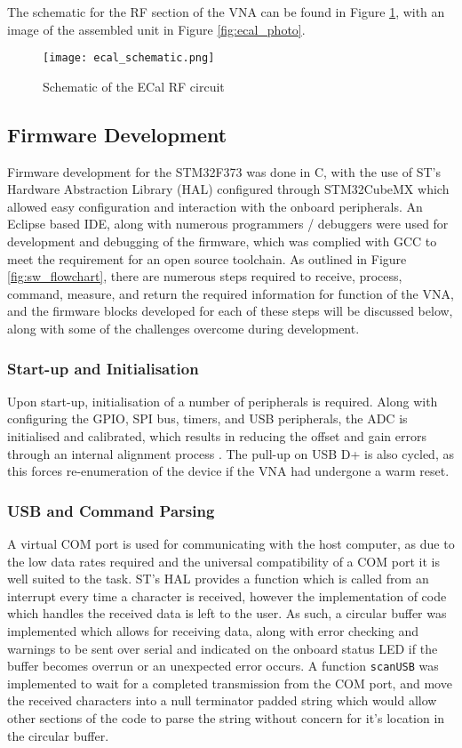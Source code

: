 The schematic for the RF section of the VNA can be found in Figure \ref{fig:ecal_schematic}, with an image of the assembled unit in Figure \ref{fig:ecal_photo}.

\begin{figure}[H]
	\centering
	\texttt{[image: ecal\_schematic.png]}
	\caption{Schematic of the ECal RF circuit}
	\label{fig:ecal_schematic}
\end{figure}

\newpage
\subsection{Firmware Development}
Firmware development for the STM32F373 was done in C, with the use of ST's Hardware Abstraction Library (HAL) configured through STM32CubeMX which allowed easy configuration and interaction with the onboard peripherals. An Eclipse based IDE, along with numerous programmers / debuggers were used for development and debugging of the firmware, which was complied with GCC to meet the requirement for an open source toolchain. As outlined in Figure \ref{fig:sw_flowchart}, there are numerous steps required to receive, process, command, measure, and return the required information for function of the VNA, and the firmware blocks developed for each of these steps will be discussed below, along with some of the challenges overcome during development. 

\subsubsection{Start-up and Initialisation}
Upon start-up, initialisation of a number of peripherals is required. Along with configuring the GPIO, SPI bus, timers, and USB peripherals, the ADC is initialised and calibrated, which results in reducing the offset and gain errors through an internal alignment process \cite{st_sdadc}. The pull-up on USB D+ is also cycled, as this forces re-enumeration of the device if the VNA had undergone a warm reset. 

\subsubsection{USB and Command Parsing}
A virtual COM port is used for communicating with the host computer, as due to the low data rates required and the universal compatibility of a COM port it is well suited to the task. ST's HAL provides a function which is called from an interrupt every time a character is received, however the implementation of code which handles the received data is left to the user. As such, a circular buffer was implemented which allows for receiving data, along with error checking and warnings to be sent over serial and indicated on the onboard status LED if the buffer becomes overrun or an unexpected error occurs. A function \texttt{scanUSB} was implemented to wait for a completed transmission from the COM port, and move the received characters into a null terminator padded string which would allow other sections of the code to parse the string without concern for it's location in the circular buffer. 


